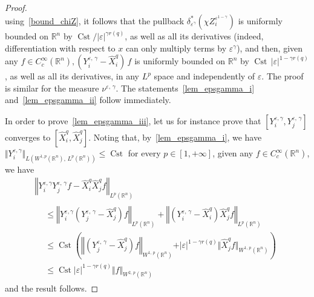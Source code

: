 \documentclass[AHL,Unicode,published]{cedram}
\newcommand*\R{\mathbb{R}}
\DeclareMathOperator{\Cst}{Cst}
\renewcommand{\leq}{\leqslant}
\begin{document}
\begin{proof}
\[\]
using~\eqref{bound_chiZ}, it follows that the pullback $\delta_{\varepsilon^\gamma}^* (\chi Z_i^{\varepsilon^{1-\gamma}} )$ is uniformly bounded on $\R^n$ by $\Cst/\vert\varepsilon\vert^{\gamma r(q)}$, as well as all its derivatives (indeed, differentiation with respect to $x$ can only multiply terms by $\varepsilon^\gamma$), and then, given any
$
f\in C_c^\infty(\R^n), (Y_i^{\varepsilon,\,\gamma}-\widehat{X}_i^{q})\,f
$
 is uniformly bounded on $\R^n$ by $\Cst\,\vert\varepsilon\vert^{1-\gamma r(q)}$, as well as all its derivatives, in any $L^p$ space and independently of $\varepsilon$. The proof is similar for the measure $\nu^{\varepsilon,\,\gamma}$. The statements~\eqref{lem_epsgamma_i} and~\eqref{lem_epsgamma_ii} follow immediately.

In order to prove~\eqref{lem_epsgamma_iii}, let us for instance prove that $[Y_i^{\varepsilon,\gamma},Y_j^{\varepsilon,\,\gamma}]$ converges to $[\widehat{X}_i^{q},\widehat{X}_j^{q}]$. Noting that, by~\eqref{lem_epsgamma_i}, we have $\Vert Y_i^{\varepsilon,\gamma}\Vert_{L(W^{1,p}(\R^n),\,L^p(\R^n))}\leq\Cst$ for every $p\in[1,+\infty]$, given any $f\in C_c^\infty(\R^n)$, we have
\begin{multline*}
\left\Vert Y_i^{\varepsilon,\gamma}Y_j^{\varepsilon,\,\gamma}f - \widehat{X}_i^{q}\widehat{X}_j^{q}f\right\Vert_{L^p(\R^n)}\\
\begin{aligned}
&\leq \left\Vert Y_i^{\varepsilon,\gamma} \left(Y_j^{\varepsilon,\,\gamma} - \widehat{X}_j^{q}\right) f\right\Vert_{L^p(\R^n)} + \left\Vert \left(Y_i^{\varepsilon,\,\gamma} - \widehat{X}_i^{q}\right)\widehat{X}_j^{q}f\right\Vert_{L^p(\R^n)}
\\
&\leq \Cst \left(\left\Vert\left(Y_j^{\varepsilon,\,\gamma} - \widehat{X}_j^{q}\right) f\right\Vert_{W^{1,\,p}(\R^n)} + \vert\varepsilon\vert^{1-\gamma r(q)} \Vert\widehat{X}_j^{q}f\Vert_{W^{1,\,p}(\R^n)} \right) \\
&\leq \Cst \vert\varepsilon\vert^{1-\gamma r(q)} \Vert f\Vert_{W^{2,\,p}(\R^n)}
\end{aligned}
\end{multline*}
and the result follows.


\end{proof}
\end{document}
